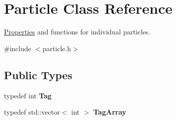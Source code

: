 \hypertarget{classParticle}{\section{\-Particle \-Class \-Reference}
\label{classParticle}
}


\hyperlink{structProperties}{\-Properties} and functions for individual particles.  




{\ttfamily \#include $<$particle.\-h$>$}

\subsection*{\-Public \-Types}
\begin{DoxyCompactItemize}
\item 
\hypertarget{classParticle_aded94129b877208bb64f1af2c51742d1}{typedef int {\bfseries \-Tag}}\label{classParticle_aded94129b877208bb64f1af2c51742d1}

\item 
\hypertarget{classParticle_a0724b5e0276679c358b729a26f9629a4}{typedef std\-::vector$<$ int $>$ {\bfseries \-Tag\-Array}}\label{classParticle_a0724b5e0276679c358b729a26f9629a4}

\end{DoxyCompactItemize}
